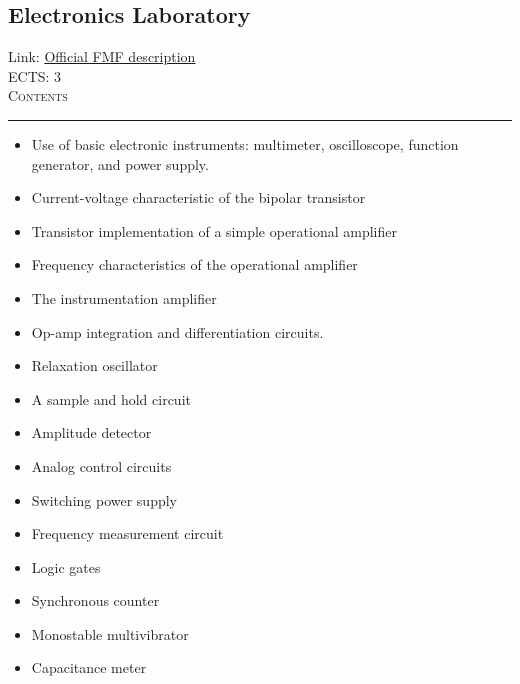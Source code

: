 \documentclass[11pt, a4paper]{article}
\newenvironment{course}[3]{
\subsection{#1}%
Link: \href{#2}{Official FMF description}\\%
ECTS: #3%
\vspace{1ex}
\\
{\large \textsc{Contents}}\\[-0.9ex]%
\rule{\textwidth}{0.5pt}
\vspace{-3ex}
}
{}
\newenvironment{chapter}[1]{
\begin{tcolorbox}[title=#1, breakable]
}
{\end{tcolorbox}}
\begin{document}
\begin{course}{Electronics Laboratory}{https://www.fmf.uni-lj.si/en/study-physics/programmes/1fiz/2020/7000777/courses/1136/}{3}
    \label{electronics_laboratory}

    \begin{chapter}{List of labs and projects}
        \begin{itemize}
        
            \item Use of basic electronic instruments: multimeter, oscilloscope, function generator, and power supply.

            \item Current-voltage characteristic of the bipolar transistor

            \item Transistor implementation of a simple operational amplifier

            \item Frequency characteristics of the operational amplifier

            \item The instrumentation amplifier

            \item Op-amp integration and differentiation circuits.

            \item Relaxation oscillator

            \item A sample and hold circuit

            \item Amplitude detector

            \item Analog control circuits

            \item Switching power supply

            \item Frequency measurement circuit

            \item Logic gates

            \item Synchronous counter

            \item Monostable multivibrator

            \item Capacitance meter


\end{itemize}
\end{chapter}
\end{course}
\end{document}
